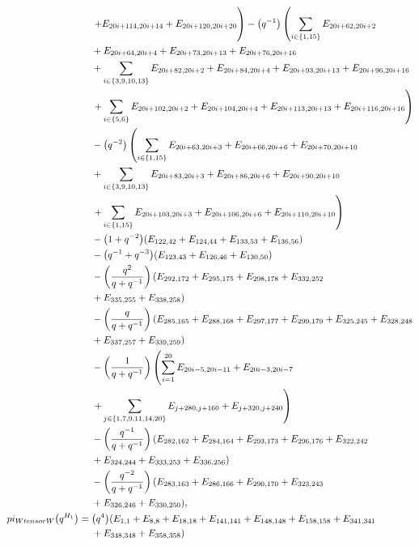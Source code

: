 \documentclass[10pt,a4paper]{amsart}
\numberwithin{equation}{section}
\theoremstyle{definition}
\def\pi{pi}
\def\otimes{ tensor }
\begin{document}
\begin{align*}
&\left.+ E_{20i+114,20i+14}+ E_{20i+120,20i+20} \vphantom{\sum_{i \in \{5,6\}}}\right)-\bigl(q^{-1}\bigr)\left( \sum_{i \in \{1,15\}} E_{20i+62,20i+2}\right. \\
&+ E_{20i+64,20i+4} + E_{20i+73,20i+13} + E_{20i+76,20i+16} \\
&+ \sum_{i \in \{3,9,10,13\}} E_{20i+82,20i+2} + E_{20i+84,20i+4} + E_{20i+93,20i+13} + E_{20i+96,20i+16} \\
&\left. + \sum_{i \in \{5,6\}} E_{20i+102,20i+2} + E_{20i+104,20i+4} + E_{20i+113,20i+13} + E_{20i+116,20i+16} \right)\\
&-\bigl(q^{-2}\bigr)\left( \sum_{i \in \{1,15\}} E_{20i+63,20i+3} + E_{20i+66,20i+6} + E_{20i+70,20i+10}\right.\\
&+ \sum_{i \in \{3,9,10,13\}} E_{20i+83,20i+3} + E_{20i+86,20i+6} + E_{20i+90,20i+10} \\
&\left. + \sum_{i \in \{1,15\}} E_{20i+103,20i+3} + E_{20i+106,20i+6} + E_{20i+110,20i+10} \right)\\
&-\bigl(1 + q^{-2}\bigr)(E_{122,42}+E_{124,44}+E_{133,53}+E_{136,56})\\
&-\bigl(q^{-1} + q^{-3}\bigr)(E_{123,43}+E_{126,46}+E_{130,50})\\
&-\left(\frac{q^2}{q + q^{-1}}\right)(E_{292,172}+E_{295,175}+E_{298,178}+E_{332,252}\\
&+E_{335,255}+E_{338,258})\\
&-\left(\frac{q}{q + q^{-1}}\right)(E_{285,165}+E_{288,168}+E_{297,177}+E_{299,179}+E_{325,245}+E_{328,248}\\
&+E_{337,257}+E_{339,259})\\
&-\left(\frac{1}{q + q^{-1}}\right)\left( \sum_{i=1}^{20} E_{20i-5,20i-11} + E_{20i-3,20i-7} \vphantom{\sum_{j \in \{1,7,9,11,14,20\}}}\right.\\
&\left. + \sum_{j \in \{1,7,9,11,14,20\}} E_{j+280,j+160} + E_{j+320,j+240} \right) \\
&-\left(\frac{q^{-1}}{q + q^{-1}}\right)(E_{282,162}+E_{284,164}+E_{293,173}+E_{296,176}+E_{322,242}\\
&+E_{324,244}+E_{333,253}+E_{336,256})\\
&-\left(\frac{q^{-2}}{q + q^{-1}}\right)(E_{283,163}+E_{286,166}+E_{290,170}+E_{323,243}\\
&+E_{326,246}+E_{330,250}),
\\
 \pi_{W \otimes W}\bigl(q^{H_1}\bigr) ={}&
\bigl(q^4\bigr)(E_{1,1}+E_{8,8}+E_{18,18}+E_{141,141}+E_{148,148}+E_{158,158}+E_{341,341}\\
&+E_{348,348}+E_{358,358})\\

\end{align*}
\end{document}
